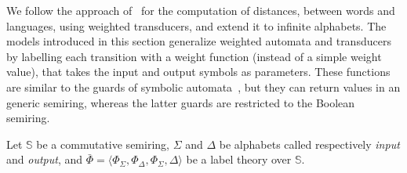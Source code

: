 \documentclass[runningheads]{llncs}
\def\<#1>{\langle #1 \rangle}
\newcommand{\Semiring}{\mathbb{S}}
\begin{document}
We follow the approach of~\cite{Mohri03EDWA} for the computation of distances,
between words and languages, using weighted transducers, 
and extend it to infinite alphabets.
%
The models introduced in this section generalize 
weighted automata and transducers~\cite{Droste09handbook} 
by labelling each transition with a weight function (instead of a simple weight value), 
that takes the input and output symbols as parameters. 
These functions are similar to the guards of symbolic automata~\cite{dAntoniVeanes17CAV,dAntoni21CACM},
but they can return values in an generic semiring, 
whereas the latter guards are restricted to the Boolean semiring.


\noindent 
Let $\Semiring$ be a commutative semiring, 
$\Sigma$ and $\Delta$ be alphabets called respectively \emph{input} and \emph{output}, %
and $\bar\Phi = \< \Phi_\Sigma, \Phi_\Delta, \Phi_{\Sigma, \Delta}>$ be a label theory over $\Semiring$.
\end{document}
